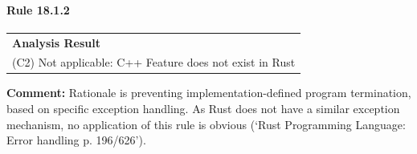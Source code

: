 \paragraph{Rule 18.1.2}
\begin{longtable}{p{13cm}}
\textbf{Analysis Result} \\
(C2) Not applicable: C++ Feature does not exist in Rust \\
\end{longtable}
\textbf{Comment:} Rationale is preventing implementation-defined program termination, based on \Cpp specific exception handling. As Rust does not have a similar exception mechanism, no application of this rule is obvious (`Rust Programming Language: Error handling p. 196/626'). \\
